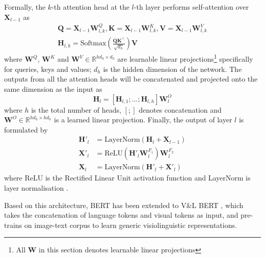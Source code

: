 \documentclass[final]{cvpr}
\begin{document}
Formally, the $k$-th attention head at the $l$-th layer performs self-attention over $\boldsymbol{X}_{l-1}$ as
\begin{gather}
\boldsymbol{Q} = \boldsymbol{X}_{l-1}\boldsymbol{W}^{Q}_{l,k}, \boldsymbol{K} = \boldsymbol{X}_{l-1}\boldsymbol{W}^{K}_{l,k}, \boldsymbol{V} = \boldsymbol{X}_{l-1}\boldsymbol{W}^{V}_{l,k} \\
\boldsymbol{H}_{l,k} = 
\text{Softmax}\left(\frac{\boldsymbol{Q}\boldsymbol{K}^\top}{\sqrt{d_h}}\right)\boldsymbol{V}
\label{eqn:selfattn}
\end{gather}
where $\boldsymbol{W}^{Q}$, $\boldsymbol{W}^{K}$ and $\boldsymbol{W}^{V}\in\mathbb{R}^{hd_{h}\times{d}_{h}}$ are learnable linear projections\footnote{All $\boldsymbol{W}$ in this section denotes learnable linear projections} specifically for queries, keys and values; $d_{h}$ is the hidden dimension of the network.
The outputs from all the attention heads will be concatenated and projected onto the same dimension as the input as
\begin{equation}
\boldsymbol{H}_{l} = \left[\boldsymbol{H}_{l,1};...;\boldsymbol{H}_{l,h}\right]\boldsymbol{W}^{O}_{l}
\label{eqn:multihead}
\end{equation}
where $h$ is the total number of heads, $[;]$ denotes concatenation and $\boldsymbol{W}^{O}\in\mathbb{R}^{hd_{h}\times{hd_{h}}}$ is a learned linear projection.
Finally, the output of layer $l$ is formulated by
\begin{align}
\boldsymbol{H}'_{l} &= \text{LayerNorm}(\boldsymbol{H}_{l}+\boldsymbol{X}_{l-1}) \\
\boldsymbol{X}'_{l} &= \text{ReLU}(\boldsymbol{H}'_{l}\boldsymbol{W}^{F_1}_{l})\boldsymbol{W}^{F_2}_{l} \\
\boldsymbol{X}_{l} &= \text{LayerNorm}(\boldsymbol{H}'_{l}+\boldsymbol{X}'_{l})
\label{eqn:layerout}
\end{align}
where ReLU is the Rectified Linear Unit activation function and LayerNorm is layer normalisation \cite{ba2016layer}.

Based on this architecture, BERT has been extended to V\&L BERT \cite{chen2020uniter,li2020unicoder, li2019visualbert,li2020oscar,lu2019vilbert,su2019vl,tan2019lxmert}, which takes the concatenation of language tokens and visual tokens as input, and pre-trains on image-text corpus to learn generic visiolinguistic representations.
\end{document}
